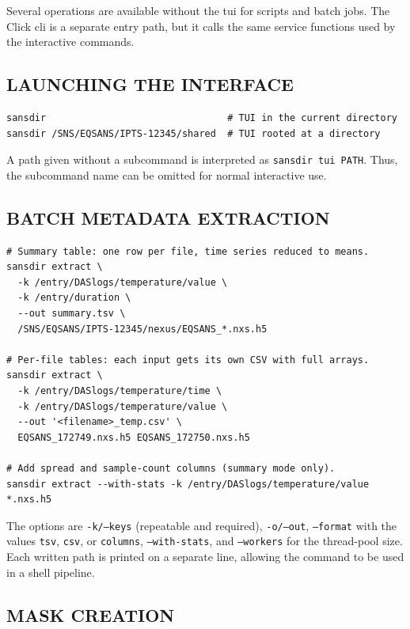 \documentclass[tm]{ornltm}
\begin{document}
Several operations are available without the \ac{tui} for scripts and batch
jobs. The Click \ac{cli} is a separate entry path, but it calls the same service
functions used by the interactive commands.

\subsection{LAUNCHING THE INTERFACE}

\begin{lstlisting}[language=shellsession]
sansdir                                # TUI in the current directory
sansdir /SNS/EQSANS/IPTS-12345/shared  # TUI rooted at a directory
\end{lstlisting}

A path given without a subcommand is interpreted as \texttt{sansdir tui PATH}.
Thus, the subcommand name can be omitted for normal interactive use.

\subsection{BATCH METADATA EXTRACTION}

\begin{lstlisting}[language=shellsession]
# Summary table: one row per file, time series reduced to means.
sansdir extract \
  -k /entry/DASlogs/temperature/value \
  -k /entry/duration \
  --out summary.tsv \
  /SNS/EQSANS/IPTS-12345/nexus/EQSANS_*.nxs.h5

# Per-file tables: each input gets its own CSV with full arrays.
sansdir extract \
  -k /entry/DASlogs/temperature/time \
  -k /entry/DASlogs/temperature/value \
  --out '<filename>_temp.csv' \
  EQSANS_172749.nxs.h5 EQSANS_172750.nxs.h5

# Add spread and sample-count columns (summary mode only).
sansdir extract --with-stats -k /entry/DASlogs/temperature/value *.nxs.h5
\end{lstlisting}

The options are \texttt{-k/--keys} (repeatable and required),
\texttt{-o/--out}, \texttt{--format} with the values \texttt{tsv},
\texttt{csv}, or \texttt{columns}, \texttt{--with-stats}, and
\texttt{--workers} for the thread-pool size. Each written path is printed on a
separate line, allowing the command to be used in a shell pipeline.

\subsection{MASK CREATION}
\end{document}
